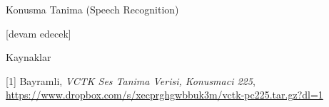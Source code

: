 \documentclass[12pt,fleqn]{article}\usepackage{../../common}
\begin{document}
Konusma Tanima (Speech Recognition)












[devam edecek]

Kaynaklar

[1] Bayramli, {\em VCTK Ses Tanima Verisi, Konusmaci 225}, \url{https://www.dropbox.com/s/xecprghgwbbuk3m/vctk-pc225.tar.gz?dl=1}
\end{document}
